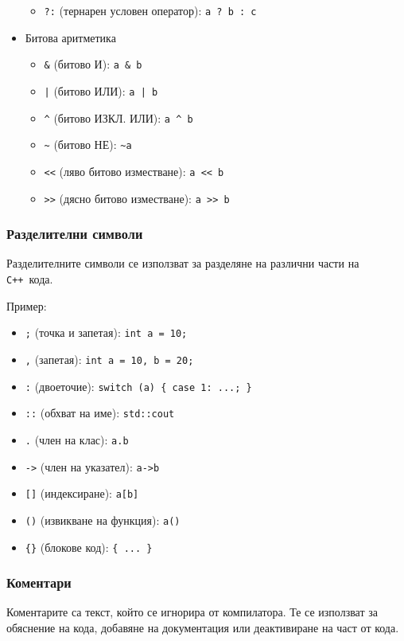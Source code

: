 \documentclass[oneside]{book}
\newcommand*{\code}[1]{\texttt{#1}}
\newcommand*{\cpp}{\texttt{C++}\ }
\begin{document}
\begin{itemize}
\begin{itemize}
        \item[] \code{?:} (тернарен условен оператор): \code{a ? b : c}
    \end{itemize}
    \item[] Битова аритметика
    \begin{itemize}
        \item[] \code{\&} (битово И): \code{a \& b}
        \item[] \code{|} (битово ИЛИ): \code{a | b}
        \item[] \code{\^{}} (битово ИЗКЛ. ИЛИ): \code{a \^{} b}
        \item[] \code{\~{}} (битово НЕ): \code{\~{}a}
        \item[] \code{<}\code{<} (ляво битово изместване): \code{a <}\code{< b}
        \item[] \code{>}\code{>} (дясно битово изместване): \code{a >}\code{> b}
    \end{itemize}
\end{itemize}

\subsubsection{Разделителни символи}
Разделителните символи се използват за разделяне на различни части на \cpp кода.

Пример:
\begin{itemize}
    \item[] \code{;} (точка и запетая): \code{int a = 10;}
    \item[] \code{,} (запетая): \code{int a = 10, b = 20;}
    \item[] \code{:} (двоеточие): \code{switch (a) \{ case 1: ...; \}}
    \item[] \code{::} (обхват на име): \code{std::cout}
    \item[] \code{.} (член на клас): \code{a.b}
    \item[] \code{->} (член на указател): \code{a->b}
    \item[] \code{[]} (индексиране): \code{a[b]}
    \item[] \code{()} (извикване на функция): \code{a()}
    \item[] \code{\{\}} (блокове код): \code{\{ ... \}}
\end{itemize}

\subsubsection{Коментари}
Коментарите са текст, който се игнорира от компилатора. Те се използват за обяснение на кода, добавяне на документация или деактивиране на част от кода.
\end{document}

